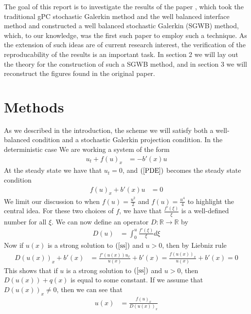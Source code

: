 \documentclass[12pt]{article}
\begin{document}
The goal of this report is to investigate the results of the paper \cite{Jin2015}, which took the traditional gPC stochastic Galerkin method and the well balanced interface method and constructed a well balanced stochastic Galerkin (SGWB) method, which, to our knowledge, was the first such paper to employ such a technique.
As the extension of such ideas are of current research interest, the verification of the reproducability of the results is an important task.
In section 2 we will lay out the theory for the construction of such a SGWB method, and in section 3 we will reconstruct the figures found in the original paper.

\section{Methods}
As we described in the introduction, the scheme we will satisfy both a well-balanced condition and a stochastic Galerkin projection condition. In the deterministic case We are working a system of the form
\begin{align}
    u_t + f(u)_x &= -b'(x)u \label{PDE}
\end{align}
At the steady state we have that $u_t = 0$, and $(\ref{PDE})$ becomes the steady state condition
\begin{align}
    f(u)_x +b'(x)u &= 0 \label{ss}
\end{align}
We limit our discussion to when $f(u) = \frac{u^2}{2}$ and $f(u) = \frac{u^4}{4}$ to highlight the central idea. For these two choices of $f$, we have that $\frac{f'(\xi)}{\xi}$ is a well-defined number for all $\xi$. We can now define an operator $D:\mathbb{R}\to\mathbb{R}$ by
\begin{align*}
    D(u) &= \int_0^{u}\frac{f'(\xi)}{\xi}d\xi
\end{align*}
Now if $u(x)$ is a strong solution to $(\ref{ss})$ and $u > 0$, then by Liebniz rule
\begin{align*}
    D(u(x))_x + b'(x) &= \frac{f'(u(x))u_x}{u(x)} + b'(x) = \frac{f(u(x))_x}{u(x)} + b'(x) = 0
\end{align*}
This shows that if $u$ is a strong solution to $(\ref{ss})$ and $u > 0$, then $D(u(x)) + q(x)$ is equal to some constant. If we assume that $D(u(x))_x\not=0$, then we can see that
\begin{align}
    u(x) &= \frac{f(u)_x}{D(u(x))_x}\label{u(x)}
\end{align}
\end{document}
